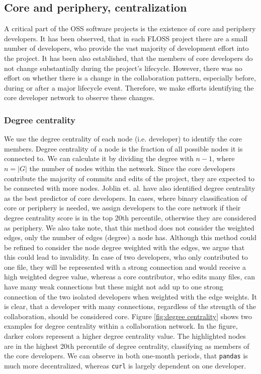 \subsection{Core and periphery, centralization}
A critical part of the OSS software projects is the existence of core and periphery developers. It has been observed, that in each FLOSS project there are a small number of developers, who provide the vast majority of development effort into the project. It has been also established, that the members of core developers do not change substantially during the project's lifecycle. However, there was no effort on whether there is a change in the collaboration pattern, especially before, during or after a major lifecycle event. Therefore, we make efforts identifying the core developer network to observe these changes. \\

\subsubsection{Degree centrality}

We use the degree centrality of each node (i.e. developer) to identify the core members. Degree centrality of a node is the fraction of all possible nodes it is connected to. We can calculate it by dividing the degree with $n-1$, where $n = |G|$ the number of nodes within the network. Since the core developers contribute the majority of commits and edits of the project, they are expected to be connected with more nodes. Joblin et. al. \cite{joblinClassifyingDevelopersCore2016, joblinEvolutionaryTrendsDeveloper2017} have also identified degree centrality as the best predictor of core developers. In cases, where binary classification of core or periphery is needed, we assign developers to the core network if their degree centrality score is in the top 20th percentile, otherwise they are considered as periphery. We also take note, that this method does not consider the weighted edges, only the number of edges (degree) a node has. Although this method could be refined to consider the node degree weighted with the edges, we argue that this could lead to invalidity. In case of two developers, who only contributed to one file, they will be represented with a strong connection and would receive a high weighted degree value, whereas a core contributor, who edits many files, can have many weak connections but these might not add up to one strong connection of the two isolated developers when weighted with the edge weights. It is clear, that a developer with many connections, regardless of the strength of the collaboration, should be considered core. Figure \ref{fig:degree centrality} shows two examples for degree centrality within a collaboration network. In the figure, darker colors represent a higher degree centrality value. The  highlighted nodes are in the highest 20th percentile of degree centrality, classifying as members of the core developers. We can observe in both one-month periods, that \texttt{pandas} is much more decentralized, whereas \texttt{curl} is largely dependent on one developer.\\

